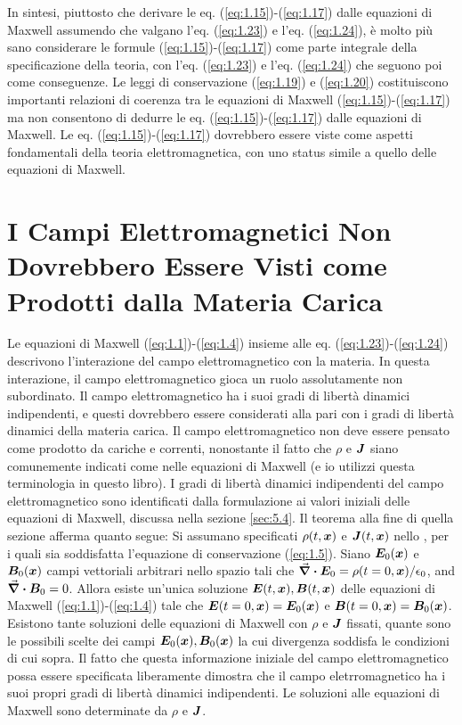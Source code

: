 In sintesi, piuttosto che derivare le eq. (\ref{eq:1.15})-(\ref{eq:1.17}) dalle equazioni di Maxwell assumendo che valgano l'eq. (\ref{eq:1.23}) e l'eq. (\ref{eq:1.24}), è molto più sano considerare le formule (\ref{eq:1.15})-(\ref{eq:1.17}) come parte integrale della specificazione della teoria, con l'eq. (\ref{eq:1.23}) e l'eq. (\ref{eq:1.24}) che seguono poi come conseguenze. Le leggi di conservazione (\ref{eq:1.19}) e (\ref{eq:1.20}) costituiscono importanti relazioni di coerenza tra le equazioni di Maxwell (\ref{eq:1.15})-(\ref{eq:1.17}) ma non consentono di dedurre le eq. (\ref{eq:1.15})-(\ref{eq:1.17}) dalle equazioni di Maxwell. Le eq. (\ref{eq:1.15})-(\ref{eq:1.17}) dovrebbero essere viste come aspetti fondamentali della teoria elettromagnetica, con uno status simile a quello delle equazioni di Maxwell.

\section[Non il Prodotto di Cariche e Correnti]{I Campi Elettromagnetici Non Dovrebbero Essere Visti come Prodotti dalla Materia Carica}\label{sec:1.3}
Le equazioni di Maxwell (\ref{eq:1.1})-(\ref{eq:1.4}) insieme alle eq. (\ref{eq:1.23})-(\ref{eq:1.24}) descrivono l'interazione del campo elettromagnetico con la materia. In questa interazione, il campo elettromagnetico gioca un ruolo assolutamente non subordinato. Il campo elettromagnetico ha i suoi gradi di libertà dinamici indipendenti, e questi dovrebbero essere considerati alla pari con i gradi di libertà dinamici della materia carica. Il campo elettromagnetico non deve essere pensato come prodotto da cariche e correnti, nonostante il fatto che $\rho$ e $\vb*{J}$ siano comunemente indicati come  nelle equazioni di Maxwell (e io utilizzi questa terminologia in questo libro). I gradi di libertà dinamici indipendenti del campo elettromagnetico sono identificati dalla formulazione ai valori iniziali delle equazioni di Maxwell, discussa nella sezione \ref{sec:5.4}. Il teorema alla fine di quella sezione afferma quanto segue: 
Si assumano specificati $\rho(t, \vb*{x})$ e $\vb*{J}(t, \vb*{x})$ nello , per i quali sia soddisfatta l'equazione di conservazione (\ref{eq:1.5}). 
Siano $\vb*{E}_0(\vb*{x})$ e $\vb*{B}_0(\vb*{x})$ campi vettoriali arbitrari nello spazio tali che $\div{\vb*{E}_0} = \rho(t=0, \vb*{x})/\epsilon_0$, and $\div{\vb*{B}_0} = 0$. 
Allora esiste un'unica soluzione $\vb*{E}(t, \vb*{x}), \vb*{B}(t, \vb*{x})$ delle equazioni di Maxwell (\ref{eq:1.1})-(\ref{eq:1.4}) tale che 
$\vb*{E}(t=0, \vb*{x}) = \vb*{E}_0(\vb*{x})$ e $\vb*{B}(t=0, \vb*{x}) = \vb*{B}_0(\vb*{x})$. Esistono tante soluzioni delle equazioni di Maxwell con 
$\rho$ e $\vb*{J}$ fissati, quante sono le possibili scelte dei campi $\vb*{E}_0(\vb*{x}), \vb*{B}_0(\vb*{x})$ la cui divergenza soddisfa le condizioni di cui sopra. Il fatto che questa informazione iniziale del campo elettromagnetico possa essere specificata liberamente dimostra che il campo eletrromagnetico ha i suoi propri gradi di libertà dinamici indipendenti. Le soluzioni alle equazioni di Maxwell  sono determinate da $\rho$ e $\vb*{J}$.

